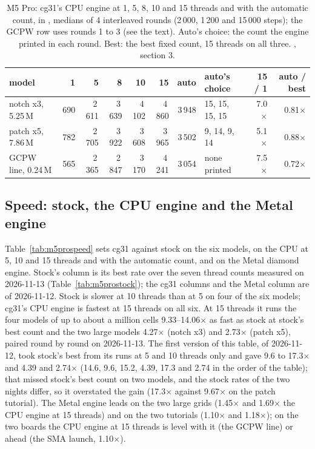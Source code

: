 \begin{table}[H]\centering\small
\begin{tabular}{@{}lrrrrrrlrr@{}}
\toprule
model & 1 & 5 & 8 & 10 & 15 & auto & auto's choice & 15 / 1 & auto / best \\
\midrule
notch x3, 5.25\,M & 690 & 2\,611 & 3\,639 & 4\,102 & 4\,860 & 3\,948 & 15, 15, 15, 15 & 7.0$\times$ & 0.81$\times$ \\
patch x5, 7.86\,M & 782 & 2\,705 & 3\,922 & 3\,608 & 3\,965 & 3\,502 & 9, 14, 9, 14 & 5.1$\times$ & 0.88$\times$ \\
GCPW line, 0.24\,M & 565 & 2\,365 & 2\,847 & 3\,170 & 4\,241 & 3\,054 & none printed & 7.5$\times$ & 0.72$\times$ \\
\bottomrule
\end{tabular}
\caption{M5 Pro: cg31's CPU engine at 1, 5, 8, 10 and 15 threads and with the automatic count, in \MC, medians of 4
interleaved rounds (2\,000, 1\,200 and 15\,000 steps); the GCPW row uses rounds 1 to 3 (see the text). Auto's choice:
the count the engine printed in each round. Best: the best fixed count, 15 threads on all three.
, section 3.}\label{tab:m5prothreads}
\end{table}

\subsection*{Speed: stock, the CPU engine and the Metal engine}
Table~\ref{tab:m5prospeed} sets cg31 against stock on the six models, on the CPU at 5, 10 and 15 threads and with the
automatic count, and on the Metal diamond engine. Stock's column is its best rate over the seven thread counts
measured on 2026-11-13 (Table~\ref{tab:m5prostock}); the cg31 columns and the Metal column are of 2026-11-12. Stock is
slower at 10 threads than at 5 on four of the six models; cg31's CPU engine is fastest at 15 threads on all six. At 15
threads it runs the four models of up to about a million cells 9.33--14.06$\times$ as fast as stock at stock's best
count and the two large models 4.27$\times$ (notch x3) and 2.73$\times$ (patch x5), paired round by round on
2026-11-13. The first version of this table, of 2026-11-12, took stock's best from its runs at 5 and 10 threads only
and gave 9.6 to 17.3$\times$ and 4.39 and 2.74$\times$ (14.6, 9.6, 15.2, 4.39, 17.3 and 2.74 in the order of the table);
that missed stock's best count on two models, and the stock rates of the two nights differ, so it overstated the gain
(17.3$\times$ against 9.67$\times$ on the patch tutorial). The Metal engine leads on the two large grids (1.45$\times$ and 1.69$\times$ the CPU engine at
15 threads) and on the two tutorials (1.10$\times$ and 1.18$\times$); on the two boards the CPU engine at 15 threads
is level with it (the GCPW line) or ahead (the SMA launch, 1.10$\times$).

